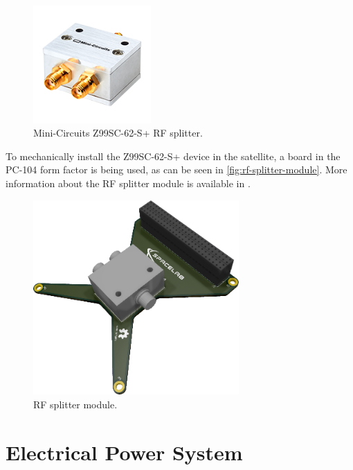 \begin{figure}[!ht]
    \begin{center}
        \includegraphics[width=0.4\textwidth]{figures/z99sc-62-s}
        \caption{Mini-Circuits Z99SC-62-S+ RF splitter.}
        \label{fig:rf-splitter}
    \end{center}
\end{figure}

To mechanically install the Z99SC-62-S+ device in the satellite, a board in the PC-104 form factor is being used, as can be seen in \autoref{fig:rf-splitter-module}. More information about the RF splitter module is available in \cite{rf-splitter}.

\begin{figure}[!ht]
    \begin{center}
        \includegraphics[width=0.7\textwidth]{figures/rf-splitter}
        \caption{RF splitter module.}
        \label{fig:rf-splitter-module}
    \end{center}
\end{figure}

\section{Electrical Power System}

